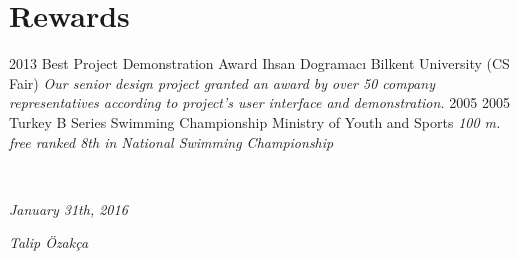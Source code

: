 \documentclass[]{friggeri-cv}
\begin{document}
\section{Rewards}
\begin{entrylist}
  \entry
    {2013}
    {Best Project Demonstration Award}
    {Ihsan Dogramacı Bilkent University (CS Fair)}
    {\emph{Our senior design project granted an award by over 50 company representatives according to project’s user interface and demonstration.}}
    \entry
    {2005}
    {2005 Turkey B Series Swimming Championship}
    {Ministry of Youth and Sports}
    {\emph{100 m. free ranked 8th in National Swimming Championship}}
\end{entrylist}
\\
\begin{flushleft}
\emph{January 31th, 2016}
\end{flushleft}
\begin{flushright}
\emph{Talip Özakça}
\end{flushright}

% 
\end{document}
